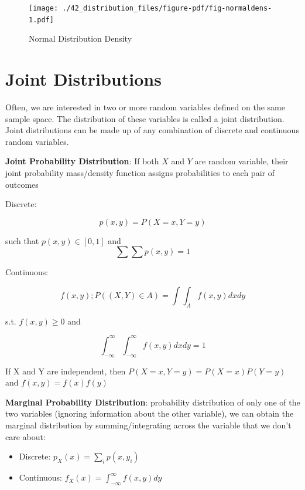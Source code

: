 \documentclass[
  letterpaper,
]{book}
\providecommand{\tightlist}{%
  \setlength{\itemsep}{0pt}\setlength{\parskip}{0pt}}\usepackage{longtable,booktabs,array}
\theoremstyle{definition}
\theoremstyle{definition}
\theoremstyle{plain}
\theoremstyle{definition}
\theoremstyle{plain}
\theoremstyle{plain}
\theoremstyle{remark}
\begin{document}
\begin{figure}

{\centering \texttt{[image: ./42\_distribution\_files/figure-pdf/fig-normaldens-1.pdf]}

}

\caption{\label{fig-normaldens}Normal Distribution Density}

\end{figure}

\hypertarget{joint-distributions}{%
\section{Joint Distributions}\label{joint-distributions}}

Often, we are interested in two or more random variables defined on the
same sample space. The distribution of these variables is called a joint
distribution. Joint distributions can be made up of any combination of
discrete and continuous random variables.

\textbf{Joint Probability Distribution}: If both \(X\) and \(Y\) are
random variable, their joint probability mass/density function assigns
probabilities to each pair of outcomes

Discrete:

\[p(x, y) = P(X = x, Y = y)\]

such that \(p(x,y) \in [0,1]\) and \[\sum\sum p(x,y) = 1\]

Continuous:

\[f(x,y);P((X,Y) \in A) = \int\!\!\!\int_A f(x,y)dx dy \]

s.t. \(f(x,y)\ge 0\) and

\[\int_{-\infty}^\infty\int_{-\infty}^\infty f(x,y)dxdy = 1\]

If X and Y are independent, then \(P(X=x,Y=y) = P(X=x)P(Y=y)\) and
\(f(x,y) = f(x)f(y)\)

\textbf{Marginal Probability Distribution}: probability distribution of
only one of the two variables (ignoring information about the other
variable), we can obtain the marginal distribution by
summing/integrating across the variable that we don't care about:

\begin{itemize}
\tightlist
\item
  Discrete: \(p_X(x) = \sum_i p(x, y_i)\)
\item
  Continuous: \(f_X(x) = \int_{-\infty}^\infty f(x,y)dy\)
\end{itemize}
\end{document}
